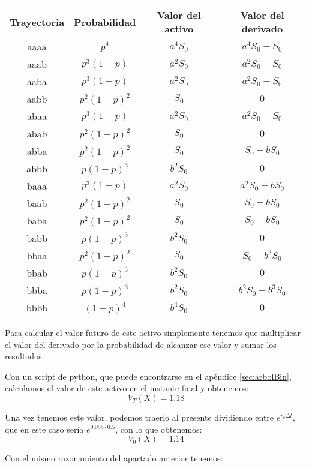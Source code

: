 \begin{problem}[1]
\begin{center}
\begin{tabular}{|c|c|c|c|}
\hline
\textbf{Trayectoria} & \textbf{Probabilidad} & \textbf{Valor del activo} & \textbf{Valor del derivado}\\
\hline
aaaa & $p^4$        & $a^4S_0$ & $a^4S_0-S_0$ \\
aaab & $p^3(1-p)$   & $a^2S_0$ & $a^2S_0-S_0$ \\
aaba & $p^3(1-p)$   & $a^2S_0$ & $a^2S_0-S_0$ \\
aabb & $p^2(1-p)^2$ & $S_0$ & $0$ \\
abaa & $p^3(1-p)$   & $a^2S_0$ & $a^2S_0-S_0$ \\
abab & $p^2(1-p)^2$ & $S_0$ & $0$ \\
abba & $p^2(1-p)^2$ & $S_0$ & $S_0-bS_0$ \\
abbb & $p(1-p)^3$   & $b^2S_0$ & $0$ \\
baaa & $p^3(1-p)$   & $a^2S_0$ & $a^2S_0-bS_0$ \\
baab & $p^2(1-p)^2$ & $S_0$ & $S_0-bS_0$ \\
baba & $p^2(1-p)^2$ & $S_0$ & $S_0-bS_0$ \\
babb & $p(1-p)^3$   & $b^2S_0$ & $0$ \\
bbaa & $p^2(1-p)^2$ & $S_0$ & $S_0-b^2S_0$ \\
bbab & $p(1-p)^3$   & $b^2S_0$ & $0$ \\
bbba & $p(1-p)^3$   & $b^2S_0$ & $b^2S_0-b^3S_0$ \\
bbbb & $(1-p)^4$    & $b^4S_0$ & $0$ \\
\hline
\end{tabular}
\end{center}

Para calcular el valor futuro de este activo simplemente tenemos que multiplicar el valor del derivado por la probabilidad de alcanzar ese valor y sumar los resultados.

Con un script de python, que puede encontrarse en el apéndice \ref{sec:arbolBin}, calculamos el valor de este activo en el instante final y obtenemos:
\[V_T(X) = 1.18\]

Una vez tenemos este valor, podemos traerlo al presente dividiendo entre $e^{r_cΔt}$, que en este caso sería $e^{0.055\cdot 0.5}$, con lo que obtenemos:
\[V_0(X) = 1.14\]

\spart

Con el mismo razonamiento del apartado anterior tenemos:


\end{problem}
